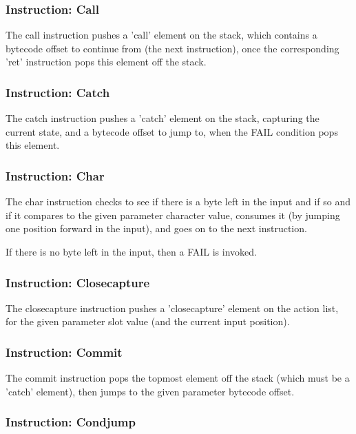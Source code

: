 \subsubsection{Instruction: Call}

The call instruction pushes a 'call' element on the stack, which contains
a bytecode offset to continue from (the next instruction), once the
corresponding 'ret' instruction pops this element off the stack.

\subsubsection{Instruction: Catch}

The catch instruction pushes a 'catch' element on the stack, capturing
the current state, and a bytecode offset to jump to, when the FAIL
condition pops this element.

\subsubsection{Instruction: Char}

The char instruction checks to see if there is a byte left in the input
and if so and if it compares to the given parameter character value, 
consumes it (by jumping one position forward in the input),
and goes on to the next instruction.

If there is no byte left in the input, then a FAIL is invoked.

\subsubsection{Instruction: Closecapture}

The closecapture instruction pushes a 'closecapture' element on the
action list, for the given parameter slot value (and the current
input position).

\subsubsection{Instruction: Commit}

The commit instruction pops the topmost element off the stack
(which must be a 'catch' element), then jumps to the given
parameter bytecode offset.

\subsubsection{Instruction: Condjump}

